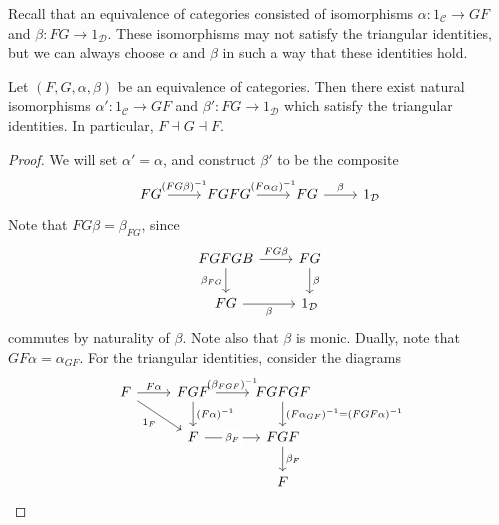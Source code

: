 Recall that an equivalence of categories consisted of isomorphisms \( \alpha : 1_{\mathcal C} \to GF \) and \( \beta : FG \to 1_{\mathcal D} \).
These isomorphisms may not satisfy the triangular identities, but we can always choose \( \alpha \) and \( \beta \) in such a way that these identities hold.
\begin{proposition}
    Let \( (F, G, \alpha, \beta) \) be an equivalence of categories.
    Then there exist natural isomorphisms \( \alpha' : 1_{\mathcal C} \to GF \) and \( \beta' : FG \to 1_{\mathcal D} \) which satisfy the triangular identities.
    In particular, \( F \dashv G \dashv F \).
\end{proposition}
\begin{proof}
    We will set \( \alpha' = \alpha \), and construct \( \beta' \) to be the composite
\[\begin{tikzcd}
	FG & FGFG & FG & {1_{\mathcal D}}
	\arrow["{(FG\beta)^{-1}}", from=1-1, to=1-2]
	\arrow["{(F\alpha_G)^{-1}}", from=1-2, to=1-3]
	\arrow["\beta", from=1-3, to=1-4]
\end{tikzcd}\]
    Note that \( FG\beta = \beta_{FG} \), since
\[\begin{tikzcd}
	FGFGB & FG \\
	FG & {1_{\mathcal D}}
	\arrow["FG\beta", from=1-1, to=1-2]
	\arrow["\beta", from=1-2, to=2-2]
	\arrow["{\beta_{FG}}"', from=1-1, to=2-1]
	\arrow["\beta"', from=2-1, to=2-2]
\end{tikzcd}\]
    commutes by naturality of \( \beta \).
    Note also that \( \beta \) is monic.
    Dually, note that \( GF\alpha = \alpha_{GF} \).
    For the triangular identities, consider the diagrams
\[\begin{tikzcd}
	F & FGF & FGFGF \\
	& F & FGF \\
	&& F
	\arrow["{F\alpha}", from=1-1, to=1-2]
	\arrow["{(\beta_{FGF})^{-1}}", from=1-2, to=1-3]
	\arrow["{(F\alpha_{GF})^{-1} = (FGF \alpha)^{-1}}", from=1-3, to=2-3]
	\arrow["{\beta_F}", from=2-3, to=3-3]
	\arrow["{(F\alpha)^{-1}}", from=1-2, to=2-2]
	\arrow["{\beta_F}"{description}, from=2-2, to=2-3]
	\arrow["{1_F}"', from=1-1, to=2-2]

\end{tikzcd}\]
\end{proof}
